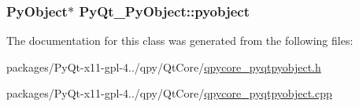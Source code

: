 \subsubsection[{pyobject}]{\setlength{\rightskip}{0pt plus 5cm}Py\+Object$\ast$ Py\+Qt\+\_\+\+Py\+Object\+::pyobject}\label{classPyQt__PyObject_a802dfa45be9c67a89b2045179a2e571c}


The documentation for this class was generated from the following files\+:\begin{DoxyCompactItemize}
\item 
packages/\+Py\+Qt-\/x11-\/gpl-\/4../qpy/\+Qt\+Core/\hyperlink{qpycore__pyqtpyobject_8h}{qpycore\+\_\+pyqtpyobject.\+h}\item 
packages/\+Py\+Qt-\/x11-\/gpl-\/4../qpy/\+Qt\+Core/\hyperlink{qpycore__pyqtpyobject_8cpp}{qpycore\+\_\+pyqtpyobject.\+cpp}\end{DoxyCompactItemize}
